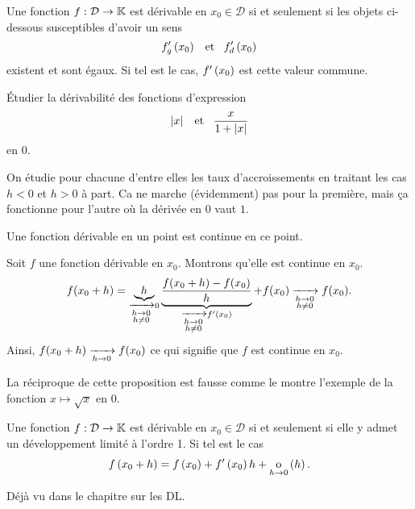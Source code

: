 \documentclass{magnolia}
\begin{document}

\begin{proposition}[utile=-3]
Une fonction $f:\mathcal{D}\to\mathbb{K}$ est dérivable en $x_0\in\mathcal{D}$ si
et seulement si les objets ci-dessous susceptibles d'avoir un sens
\[f_g'\left(x_0\right) \quad\!\text{et}\quad\! f_d'\left(x_0\right)\]
existent et sont égaux. Si tel est le cas, $f'\left(x_0\right)$ est cette valeur commune.
\end{proposition}

\begin{exoUnique}
\exo Étudier la dérivabilité des fonctions d'expression
  \[\left|x\right| \quad\!\text{et}\quad\! \frac{x}{1+\left|x\right|}\]
  en 0.
\end{exoUnique}
\begin{sol}
On étudie pour chacune d'entre elles les taux d'accroissements en traitant les cas $h<0$ et $h>0$ à part. Ca ne marche (évidemment) pas pour la première, mais ça fonctionne pour l'autre où la dérivée en $0$ vaut $1$.
\end{sol}

\begin{proposition}[utile=-3]
Une fonction dérivable en un point est continue en ce point.
\end{proposition}

\begin{preuve}
Soit $f$ une fonction dérivable en $x_0$. Montrons qu'elle est continue en $x_0$.
$$f(x_0+h)=\underbrace{h}_{\xrightarrow[ \substack{h\rightarrow 0 \\ h\not=0}]{}0}\underbrace{\frac{f(x_0+h)-f(x_0)}{h}}_{\xrightarrow[ \substack{h\rightarrow 0 \\ h\not=0}]{}f'(x_0)}+f(x_0)\xrightarrow[ \substack{h\rightarrow 0 \\ h\not=0}]{}f(x_0).$$
Ainsi, $f(x_0+h)\xrightarrow[h\rightarrow 0]{}f(x_0)$ ce qui signifie que $f$ est continue en $x_0$.
\end{preuve}

\begin{remarqueUnique}
\remarque La réciproque de cette proposition est fausse comme le montre l'exemple de la fonction
  $x\mapsto\sqrt{x}$ en 0.
\end{remarqueUnique}


\begin{proposition}[utile=-3]
Une fonction $f:\mathcal{D}\to\mathbb{K}$ est dérivable en $x_0\in\mathcal{D}$ si et seulement si elle
y admet un développement limité à l'ordre 1. Si tel est le cas
\[f\left(x_0+h\right)=f\left(x_0\right)+f'\left(x_0\right)h+\underset{h \rightarrow 0}{\text{o}}\left(h\right).\]
\end{proposition}

\begin{preuve}
Déjà vu dans le chapitre sur les DL.
\end{preuve}
\end{document}
